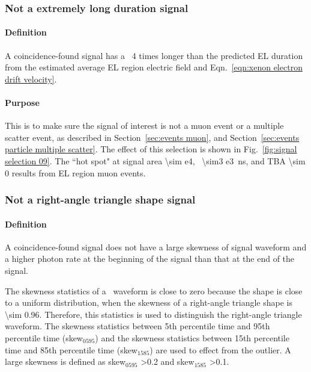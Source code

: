 \subsubsection{Not a extremely long duration signal}
\paragraph{Definition}
A coincidence-found signal has a \pud\ 4 times longer than the predicted EL duration from the estimated average EL region electric field and Eqn.~\ref{eqn:xenon electron drift velocity}. 
\paragraph{Purpose}
This is to make sure the signal of interest is not a muon event or a multiple scatter event, as described in Section~\ref{sec:events muon}, and Section~\ref{sec:events particle multiple scatter}. The effect of this selection is shown in Fig.~\ref{fig:signal selection 09}. The ``hot spot" at signal area \SI{\sim e4}{\phe}, \rpd\ \SI{\sim3 e3}{\ns}, and TBA \num{\sim 0} results from EL region muon events. 

\subsubsection{Not a right-angle triangle shape signal}
\paragraph{Definition}
A coincidence-found signal does not have a large skewness of signal waveform and a higher photon rate at the beginning of the signal than that at the end of the signal. 

The skewness statistics of a \ees\ waveform is close to zero because the shape is close to a uniform distribution, when the skewness of a right-angle triangle shape is \num{\sim 0.96}. Therefore, this statistics is used to distinguish the right-angle triangle waveform. The skewness statistics between 5th percentile time and 95th percentile time (skew$_\text{0595}$) and the skewness statistics between 15th percentile time and 85th percentile time (skew$_\text{1585}$) are used to effect from the outlier. A large skewness is defined as skew$_\text{0595}$ \num{>0.2} and skew$_\text{1585}$ \num{>0.1}.

